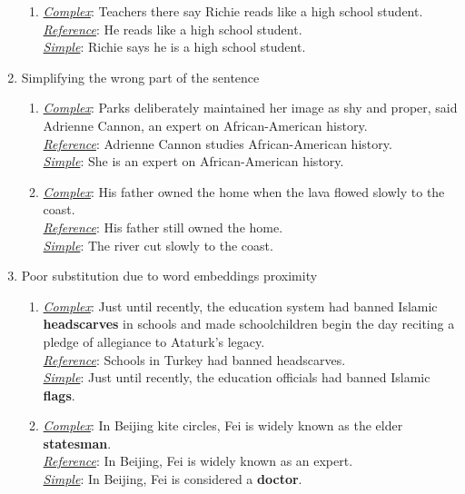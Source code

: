 \documentclass[11pt,a4paper]{article}
\begin{document}
\begin{enumerate}
\begin{enumerate}
\item {\label{anaphoraresolution2}} \underline{\it Complex}: Teachers there say Richie reads like a high school student.\\
\underline{\it Reference}: He reads like a high school student. \\
\underline{\it Simple}: Richie says he is a high school student.
\end{enumerate}

\item{Simplifying the wrong part of the sentence}
\begin{enumerate}
\small
\item{\label{wrongpart1}} \underline{\it Complex}: Parks deliberately maintained her image as shy and proper, said Adrienne Cannon, an expert on African-American history.\\
\underline{\it Reference}: Adrienne Cannon studies African-American history.\\
\underline{\it Simple}: She is an expert on African-American history.

\item{\label{wrongpart2}}\underline{\it Complex}: His father owned the home when the lava flowed slowly to the coast.\\
\underline{\it Reference}: His father still owned the home.\\
\underline{\it Simple}: The river cut slowly to the coast.\\
\end{enumerate}

\item{Poor substitution due to word embeddings proximity}
\begin{enumerate}
\small
\item{\label{badsub1}} \underline{\it Complex}: Just until recently, the education system had banned Islamic \textbf{headscarves} in schools and made schoolchildren begin the day reciting a pledge of allegiance to Ataturk's legacy.\\
\underline{\it Reference}: Schools in Turkey had banned headscarves.\\
\underline{\it Simple}: Just until recently, the education officials had banned  Islamic \textbf{flags}.
\item {\label{badsub2}} \underline{\it Complex}: In Beijing kite circles, Fei is widely known as the elder \textbf{statesman}.\\
\underline{\it Reference}: In Beijing, Fei is widely known as an expert.\\
\underline{\it Simple}: In Beijing, Fei is considered a \textbf{doctor}.
\end{enumerate}


\end{enumerate}
\end{document}
